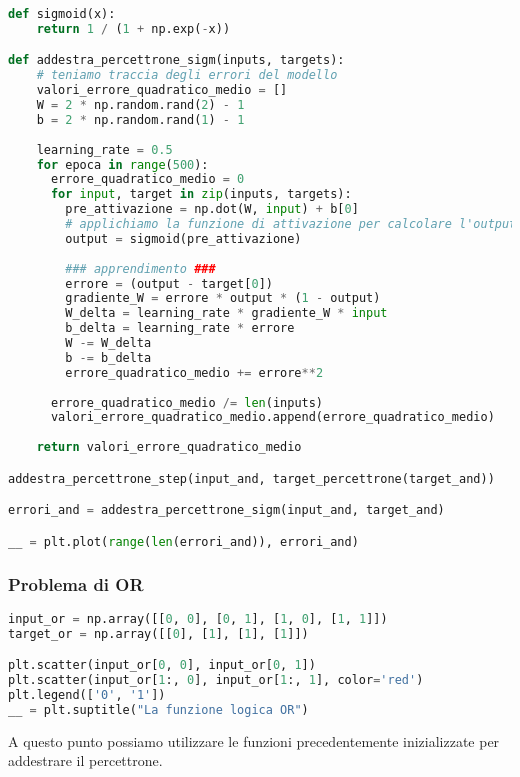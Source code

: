 \documentclass[12pt, a4paper]{article}
\begin{document}
\begin{lstlisting}[language=Python, caption=Funzione di Attivazione Sigmoidea e Output dei Risultati]
def sigmoid(x):
    return 1 / (1 + np.exp(-x))

def addestra_percettrone_sigm(inputs, targets):
    # teniamo traccia degli errori del modello  
    valori_errore_quadratico_medio = []  
    W = 2 * np.random.rand(2) - 1 
    b = 2 * np.random.rand(1) - 1
  
    learning_rate = 0.5
    for epoca in range(500):
      errore_quadratico_medio = 0
      for input, target in zip(inputs, targets):
        pre_attivazione = np.dot(W, input) + b[0]
        # applichiamo la funzione di attivazione per calcolare l'output
        output = sigmoid(pre_attivazione)  
  
        ### apprendimento ###
        errore = (output - target[0])
        gradiente_W = errore * output * (1 - output)
        W_delta = learning_rate * gradiente_W * input
        b_delta = learning_rate * errore
        W -= W_delta 
        b -= b_delta
        errore_quadratico_medio += errore**2
        
      errore_quadratico_medio /= len(inputs)
      valori_errore_quadratico_medio.append(errore_quadratico_medio)
    
    return valori_errore_quadratico_medio

addestra_percettrone_step(input_and, target_percettrone(target_and))

errori_and = addestra_percettrone_sigm(input_and, target_and)

__ = plt.plot(range(len(errori_and)), errori_and)
\end{lstlisting}

\subsubsection{Problema di OR}
\begin{lstlisting}[language=Python, caption=Inizializzazione]
input_or = np.array([[0, 0], [0, 1], [1, 0], [1, 1]])
target_or = np.array([[0], [1], [1], [1]])

plt.scatter(input_or[0, 0], input_or[0, 1])
plt.scatter(input_or[1:, 0], input_or[1:, 1], color='red')
plt.legend(['0', '1'])
__ = plt.suptitle("La funzione logica OR")
\end{lstlisting}

A questo punto possiamo utilizzare le funzioni precedentemente inizializzate per addestrare il percettrone.
\end{document}
